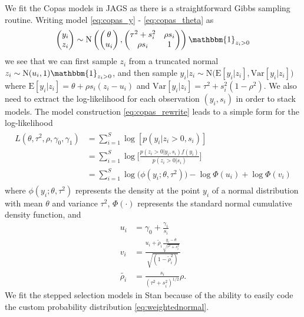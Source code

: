 \documentclass[12pt]{article}   	%
\numberwithin{equation}{section}
\begin{document}
We fit the Copas models in JAGS \citep{plummer2003jags} as there is a straightforward Gibbs sampling routine. Writing model \eqref{eq:copas_y} - \eqref{eq:copas_theta} as 
\begin{align}
\begin{pmatrix}
y_i \\
z_i
\end{pmatrix}\sim \text{N} \left(\begin{pmatrix}
\theta \\
u_i
\end{pmatrix},\begin{pmatrix}
\tau^2 + s_i^2 & \rho s_i \\
\rho s_i & 1
\end{pmatrix}\right) \mathbbm{1}_{z_i > 0} \label{eq:copas_rewrite}
\end{align}
we see that we can first sample $z_i$ from a truncated normal $z_i \sim \text{N}(u_i, 1) \mathbbm{1}_{z_i > 0}$, and then sample $y_i \vert z_i \sim \text{N}\big(\text{E}[y_i \vert z_i], \text{Var}[y_i \vert z_i]\big)$ where $\text{E}[y_i \vert z_i] = \theta + \rho s_i (z_i - u_i)$ and $\text{Var}[y_i \vert z_i] = \tau^2 + s_i^2 (1 - \rho ^ 2)$. We also need to extract the log-likelihood for each observation $(y_i, s_i)$ in order to stack models. The model construction \eqref{eq:copas_rewrite} leads to a simple form for the log-likelihood 
\begin{align}
\begin{split}
L(\theta, \tau^2, \rho, \gamma_0, \gamma_1) &= \sum_{i = 1} ^ S \log[p(y_i \vert z_i > 0, s_i)] \\
& = \sum_{i = 1} ^ S \log \Bigg[ \frac{p(z_i > 0 \vert y_i, s_i) f(y_i)}{p(z_i > 0 \vert s_i)} \Bigg] \\
& = \sum_{i = 1} ^ S \log\big(\phi(y_i ; \theta, \tau^2)\big) - \log \Phi(u_i) + \log \Phi(v_i) \label{eq:loglik}
\end{split}
\end{align}
where $\phi(y_i; \theta, \tau^2)$ represents the density at the point $y_i$ of a normal distribution with mean $\theta$ and variance $\tau^2$, $\Phi(\cdot)$ represents the standard normal cumulative density function, and 
\begin{align}
u_i &= \gamma_0 + \frac{\gamma_1}{s_i} \nonumber \\
v_i &= \frac{u_i + \tilde{\rho}_i \frac{y_i - \theta}{\sqrt{\tau^2 + s_i^2}}}{\sqrt{(1 - \tilde{\rho}_i^2)}} \nonumber \\
\tilde{\rho_i} &= \frac{s_i}{(\tau^2 + s_i^2)^{1/2}} \rho. \nonumber
\end{align}
We fit the stepped selection models in Stan \citep{gelman2015stan} because of the ability to easily code the custom probability distribution \eqref{eq:weightednormal}. 
\end{document}
